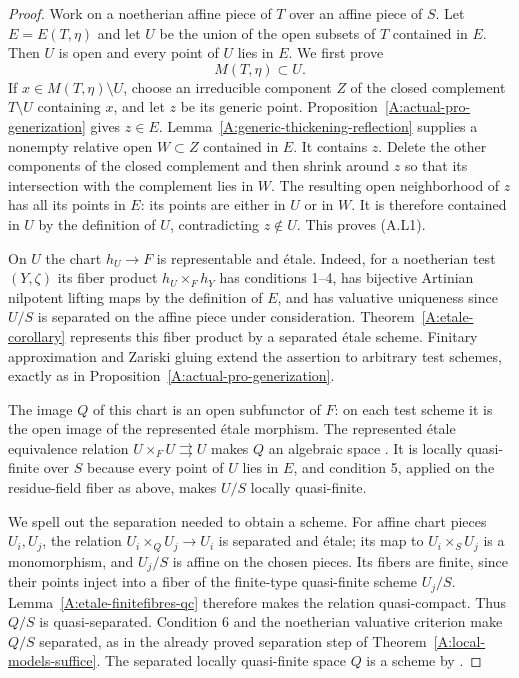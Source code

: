 \begin{proof}
Work on a noetherian affine piece of $T$ over an affine piece
of $S$.  Let $E=E(T,\eta)$ and let $U$ be the union of the
open subsets of $T$ contained in $E$.  Then $U$ is open and
every point of $U$ lies in $E$.
We first prove
\[
                              M(T,\eta)\subset U.           \tag{A.L1}
\]
If $x\in M(T,\eta)\setminus U$, choose an irreducible
component $Z$ of the closed complement $T\setminus U$
containing $x$, and let $z$ be its generic point.
Proposition~\ref{A:actual-pro-generization} gives $z\in E$.
Lemma~\ref{A:generic-thickening-reflection} supplies a
nonempty relative open $W\subset Z$ contained in $E$.
It contains $z$.  Delete the other components of the closed
complement and then shrink around $z$ so that its intersection
with the complement lies in $W$.
The resulting open neighborhood of $z$ has all its points in
$E$: its points are either in $U$ or in $W$.
It is therefore contained in $U$ by the definition of $U$,
contradicting $z\notin U$.  This proves (A.L1).

On $U$ the chart $h_U\to F$ is representable and \'etale.
Indeed, for a noetherian test $(Y,\zeta)$ its fiber product
$h_U\times_Fh_Y$ has conditions 1--4, has bijective Artinian
nilpotent lifting maps by the definition of $E$, and has
valuative uniqueness since $U/S$ is separated on the affine
piece under consideration.  Theorem~\ref{A:etale-corollary}
represents this fiber product by a separated \'etale scheme.
Finitary approximation and Zariski gluing extend the assertion
to arbitrary test schemes, exactly as in
Proposition~\ref{A:actual-pro-generization}.

The image $Q$ of this chart is an open subfunctor of $F$:
on each test scheme it is the open image of the represented
\'etale morphism.  The represented \'etale equivalence
relation $U\times_FU\rightrightarrows U$ makes $Q$ an
algebraic space \cite[Theorem 65.10.5]{Stacks02WW}.
It is locally quasi-finite over $S$ because
every point of $U$ lies in $E$, and condition 5, applied on
the residue-field fiber as above, makes $U/S$ locally
quasi-finite.

We spell out the separation needed to obtain a scheme.
For affine chart pieces $U_i,U_j$, the relation
$U_i\times_QU_j\to U_i$ is separated and \'etale; its map
to $U_i\times_SU_j$ is a monomorphism, and $U_j/S$ is affine
on the chosen pieces.  Its fibers are finite, since their
points inject into a fiber of the finite-type quasi-finite
scheme $U_j/S$.  Lemma~\ref{A:etale-finitefibres-qc} therefore
makes the relation quasi-compact.  Thus $Q/S$ is quasi-separated.
Condition 6 and the noetherian valuative criterion make $Q/S$
separated, as in the already proved separation step of
Theorem~\ref{A:local-models-suffice}.  The separated locally
quasi-finite space $Q$ is a scheme by
\cite[Proposition 67.50.2]{Stacks0417}.


\end{proof}
